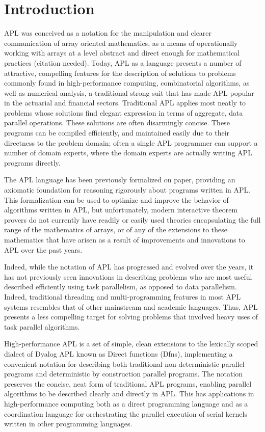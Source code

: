 \section{Introduction}

APL was conceived as a notation for the manipulation and clearer 
communication of array oriented mathematics, as a means of operationally 
working with arrays at a level abstract and direct enough for 
mathematical practices (citation needed). Today, APL as a language 
presents a number of attractive, compelling features for the description 
of solutions to problems commonly found in high-performance computing, 
combinatorial algorithms, as well as numerical analysis, a traditional 
strong suit that has made APL popular in the actuarial and financial 
sectors. Traditional APL applies most neatly to problems whose solutions 
find elegant expression in terms of aggregate, data parallel operations. 
These solutions are often disarmingly concise. These programs can be 
compiled efficiently, and maintained easily due to their directness 
to the problem domain; often a single APL programmer can support a 
number of domain experts, where the domain experts are actually writing 
APL programs directly. 

The APL language has been previously formalized on paper, providing an 
axiomatic foundation for reasoning rigorously about programs written in 
APL. This formalization can be used to optimize and improve the behavior 
of algorithms written in APL, but unfortunately, modern interactive 
theorem provers do not currently have readily or easily used theories 
encapsulating the full range of the mathematics of arrays, or of any of 
the extensions to these mathematics that have arisen as a result of 
improvements and innovations to APL over the past years. 

Indeed, while the notation of APL has progressed and evolved 
over the years, it has not previously seen innovations in describing 
problems who are most useful described efficiently using task parallelism, 
as opposed to data parallelism. Indeed, traditional threading and 
multi-programming features in most APL systems resembles that of 
other mainstream and academic languages. Thus, APL presents a less
compelling target for solving problems that involved heavy uses of 
task parallel algorithms.

High-performance APL is a set of simple, clean extensions to the 
lexically scoped dialect of Dyalog APL known as Direct functions (Dfns),
implementing a convenient notation for describing both traditional 
non-deterministic parallel programs and deterministic by construction 
parallel programs. The notation preserves the concise, neat form of 
traditional APL programs, enabling parallel algorithms to be described 
clearly and directly in APL. This has applications in high-performance 
computing both as a direct programming language and as a coordination 
language for orchestrating the parallel execution of serial kernels written in 
other programming languages.

